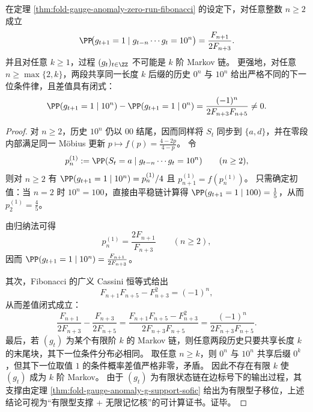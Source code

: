 \begin{theorem}\label{thm:fold-gauge-anomaly-strictly-sofic-infinite-memory}
在定理 \ref{thm:fold-gauge-anomaly-zero-run-fibonacci} 的设定下，对任意整数 \(n\ge 2\) 成立
\[
\PP\!\bigl(g_{t+1}=1\mid g_{t-n}\cdots g_t=10^n\bigr)=\frac{F_{n+1}}{2F_{n+3}}.
\]
并且对任意 \(k\ge 1\)，过程 \((g_t)_{t\in\ZZ}\) 不可能是 \(k\) 阶 Markov 链。
更强地，对任意 \(n\ge \max\{2,k\}\)，两段共享同一长度 \(k\) 后缀的历史 \(0^n\) 与 \(10^n\) 给出严格不同的下一位条件律，且差值具有闭式：
\[
\PP(g_{t+1}=1\mid 10^n)-\PP(g_{t+1}=1\mid 0^n)
=\frac{(-1)^n}{2F_{n+3}F_{n+5}}\neq 0.
\]
\end{theorem}
\begin{proof}
对 \(n\ge 2\)，历史 \(10^n\) 仍以 \(00\) 结尾，因而同样将 \(S_t\) 同步到 \(\{a,d\}\)，并在零段内部满足同一 Möbius 更新 \(p\mapsto f(p)=\frac{4-2p}{4-p}\)。
令
\[
p^{(1)}_n:=\PP(S_t=a\mid g_{t-n}\cdots g_t=10^n)\qquad(n\ge 2),
\]
则对 \(n\ge 2\) 有 \(\PP(g_{t+1}=1\mid 10^n)=p^{(1)}_n/4\) 且 \(p^{(1)}_{n+1}=f(p^{(1)}_n)\)。
只需确定初值：当 \(n=2\) 时 \(10^n=100\)，直接由平稳链计算得 \(\PP(g_{t+1}=1\mid 100)=\frac15\)，从而 \(p^{(1)}_2=\frac45\)。
\par
由归纳法可得
\[
p^{(1)}_n=\frac{2F_{n+1}}{F_{n+3}}\qquad(n\ge 2),
\]
因而
\(
\PP(g_{t+1}=1\mid 10^n)=\frac{F_{n+1}}{2F_{n+3}}
\)。
\par
其次，Fibonacci 的广义 Cassini 恒等式给出
\[
F_{n+1}F_{n+5}-F_{n+3}^2 = (-1)^n,
\]
从而差值闭式成立：
\[
\frac{F_{n+1}}{2F_{n+3}}-\frac{F_{n+3}}{2F_{n+5}}
=\frac{F_{n+1}F_{n+5}-F_{n+3}^2}{2F_{n+3}F_{n+5}}
=\frac{(-1)^n}{2F_{n+3}F_{n+5}}.
\]
最后，若 \((g_t)\) 为某个有限阶 \(k\) 的 Markov 链，则任意两段历史只要共享长度 \(k\) 的末尾块，其下一位条件分布必相同。
取任意 \(n\ge k\)，则 \(0^n\) 与 \(10^n\) 共享后缀 \(0^k\)，但其下一位取值 \(1\) 的条件概率差值严格非零，矛盾。
因此不存在有限 \(k\) 使 \((g_t)\) 成为 \(k\) 阶 Markov。
由于 \((g_t)\) 为有限状态链在边标号下的输出过程，其支撑由定理 \ref{thm:fold-gauge-anomaly-g-support-sofic} 给出为有限型子移位，上述结论可视为“有限型支撑 + 无限记忆核”的可计算证书。证毕。
\end{proof}

